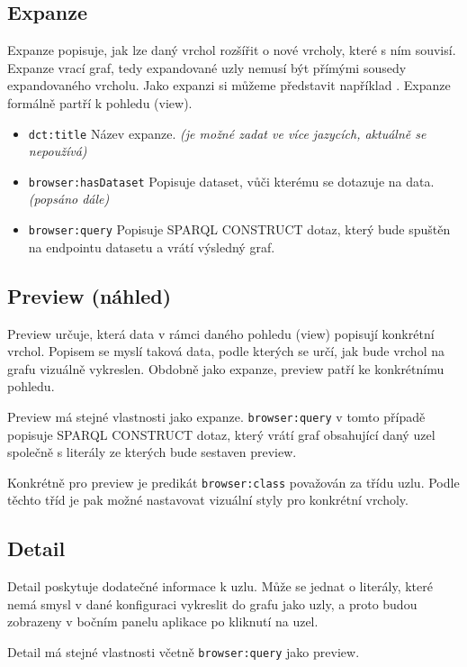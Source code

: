 \subsection{Expanze} \label{pozadavky-expansion}
Expanze popisuje, jak lze daný vrchol rozšířit o nové vrcholy, které s ním souvisí. Expanze vrací graf, tedy expandované uzly nemusí být přímými sousedy expandovaného vrcholu. Jako expanzi si můžeme představit například . Expanze formálně partří k pohledu (view).
\begin{itemize}
    \item \texttt{dct:title} Název expanze. \textit{(je možné zadat ve více jazycích, aktuálně se nepoužívá)}
    \item \texttt{browser:hasDataset} Popisuje dataset, vůči kterému se dotazuje na data. \textit{(popsáno dále)}
    \item \texttt{browser:query} Popisuje SPARQL CONSTRUCT dotaz, který bude spuštěn na endpointu datasetu a vrátí výsledný graf.
\end{itemize}

\subsection{Preview (náhled)} \label{pozadavky-preview}
Preview určuje, která data v rámci daného pohledu (view) popisují konkrétní vrchol. Popisem se myslí taková data, podle kterých se určí, jak bude vrchol na grafu vizuálně vykreslen. Obdobně jako expanze, preview patří ke konkrétnímu pohledu.

Preview má stejné vlastnosti jako expanze. \texttt{browser:query} v tomto případě popisuje SPARQL CONSTRUCT dotaz, který vrátí graf obsahující daný uzel společně s literály ze kterých bude sestaven preview.

Konkrétně pro preview je predikát \texttt{browser:class} považován za třídu uzlu. Podle těchto tříd je pak možné nastavovat vizuální styly pro konkrétní vrcholy.

\subsection{Detail} \label{pozadavky-detail}
Detail poskytuje dodatečné informace k uzlu. Může se jednat o literály, které nemá smysl v dané konfiguraci vykreslit do grafu jako uzly, a proto budou zobrazeny v bočním panelu aplikace po kliknutí na uzel.

Detail má stejné vlastnosti včetně \texttt{browser:query} jako preview.

